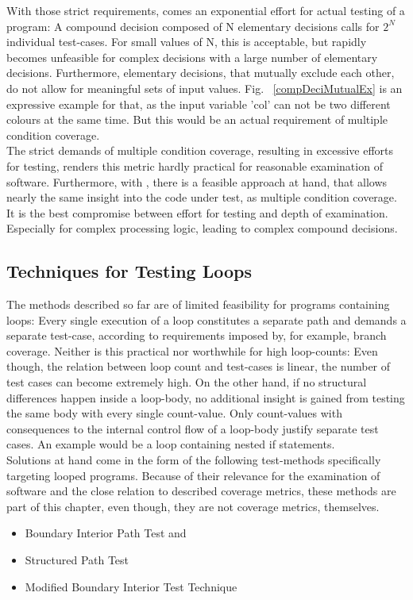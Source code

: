 	With those strict requirements, comes an exponential effort for actual testing of a program: A compound decision composed of N elementary decisions calls for $ 2^N $ individual test-cases. For small values of N, this is acceptable, but rapidly becomes unfeasible for complex decisions with a large number of elementary decisions. Furthermore, elementary decisions, that mutually exclude each other, do not allow for meaningful sets of input values. Fig. ~\ref{compDeciMutualEx} is an expressive example for that, as the input variable 'col' can not be two different colours at the same time. But this would be an actual requirement of multiple condition coverage. \\
	
	The strict demands of multiple condition coverage, resulting in excessive efforts for testing, renders this metric hardly practical for reasonable examination of software. Furthermore, with \mcdc, there is a feasible approach at hand, that allows nearly the same insight into the code under test, as multiple condition coverage. It is the best compromise between effort for testing and depth of examination. Especially for complex processing logic, leading to complex compound decisions.

	\subsection{Techniques for Testing Loops}
	The methods described so far are of limited feasibility for programs containing loops: Every single execution of a loop constitutes a separate path and demands a separate test-case, according to requirements imposed by, for example, branch coverage. Neither is this practical nor worthwhile for high loop-counts: Even though, the relation between loop count and test-cases is linear, the number of test cases can become extremely high. On the other hand, if no structural differences happen inside a loop-body, no additional insight is gained from testing the same body with every single count-value. Only count-values with consequences to the internal control flow of a loop-body justify separate test cases. An example would be a loop containing nested if statements. \\
	Solutions at hand come in the form of the following test-methods specifically targeting looped programs. Because of their relevance for the examination of software and the close relation to described coverage metrics, these methods are part of this chapter, even though, they are not coverage metrics, themselves.
	\begin{itemize} \setlength\itemsep{1px}
	\item Boundary Interior Path Test and
	\item Structured Path Test
	\item Modified Boundary Interior Test Technique
	
	\end{itemize}
